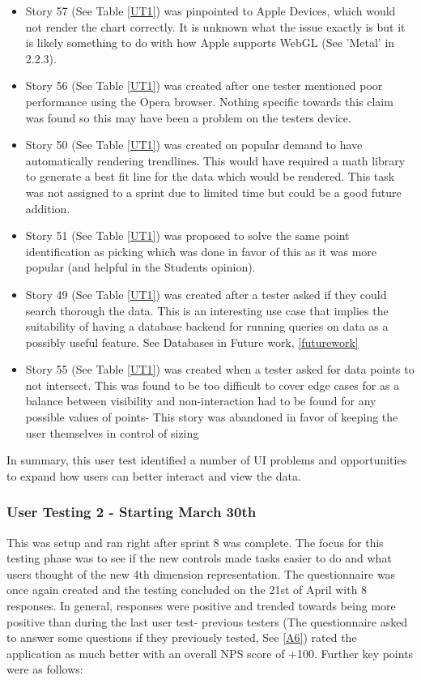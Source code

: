 \begin{itemize}
    \item Story 57 (See Table \ref{UT1}) was pinpointed to Apple Devices, which would not render the chart correctly. It is unknown what the issue exactly is but it is likely something to do with how Apple supports WebGL \cite{khronosgroup_2022_webgl} (See 'Metal' in 2.2.3).
    \item Story 56 (See Table \ref{UT1}) was created after one tester mentioned poor performance using the Opera browser. Nothing specific towards this claim was found so this may have been a problem on the testers device.
    \item Story 50 (See Table \ref{UT1}) was created on popular demand to have automatically rendering trendlines. This would have required a math library to generate a best fit line for the data which would be rendered. This task was not assigned to a sprint due to limited time but could be a good future addition.
    \item Story 51 (See Table \ref{UT1}) was proposed to solve the same point identification as picking which was done in favor of this as it was more popular (and helpful in the Students opinion).
    \item Story 49 (See Table \ref{UT1}) was created after a tester asked if they could search thorough the data. This is an interesting use case that implies the suitability of having a database backend for running queries on data as a possibly useful feature. See Databases in Future work, \ref{futurework}
    \item Story 55 (See Table \ref{UT1}) was created when a tester asked for data points to not intersect. This was found to be too difficult to cover edge cases for as a balance between visibility and non-interaction had to be found for any possible values of points- This story was abandoned in favor of keeping the user themselves in control of sizing
\end{itemize}

In summary, this user test identified a number of UI problems and opportunities to expand how users can better interact and view the data.

\subsubsection{User Testing 2 - Starting March 30th} \label{usertestanalysis2}
This was setup and ran right after sprint 8 was complete. The focus for this testing phase was to see if the new controls made tasks easier to do and what users thought of the new 4th dimension representation. The questionnaire was once again created and the testing concluded on the 21st of April with 8 responses. In general, responses were positive and trended towards being more positive than during the last user test- previous testers (The questionnaire asked to answer some questions if they previously tested, See \ref{A6}) rated the application as much better with an overall NPS score of +100. Further key points were as follows:

